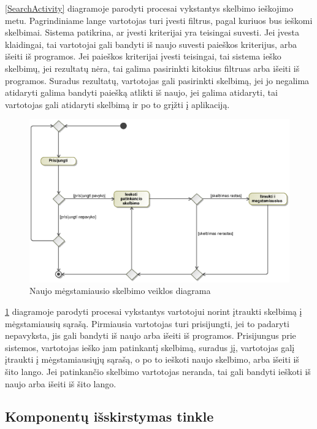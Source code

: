 \documentclass[12pt]{article}
\begin{document}
	\ref{SearchActivity} diagramoje parodyti procesai vykstantys skelbimo ieškojimo metu. Pagrindiniame lange vartotojas turi įvesti filtrus, pagal kuriuos bus ieškomi skelbimai. Sistema patikrina, ar įvesti kriterijai yra teisingai suvesti. Jei įvesta klaidingai, tai vartotojai gali bandyti iš naujo suvesti paieškos kriterijus, arba išeiti iš programos. Jei paieškos kriterijai įvesti teisingai, tai sistema ieško skelbimų, jei rezultatų nėra, tai galima pasirinkti kitokius filtruas arba išeiti iš programos. Suradus rezultatų, vartotojas gali pasirinkti skelbimą, jei jo negalima atidaryti galima bandyti paiešką atlikti iš naujo, jei galima atidaryti, tai vartotojas gali atidaryti skelbimą ir po to grįžti į aplikaciją.
	\pagebreak

	\begin{figure}[h]
		\begin{center}
			\includegraphics[width=\textwidth]{MegstamiausiuVeikla.eps}
			\caption{Naujo mėgstamiausio skelbimo veiklos diagrama\label{FavActivity}}
		\end{center}
	\end{figure}
	
	\ref{FavActivity} diagramoje parodyti procesai vykstantys vartotojui norint įtraukti skelbimą į mėgstamiausių sąrašą. Pirmiausia vartotojas turi prisijungti, jei to padaryti nepavyksta, jis gali bandyti iš naujo arba išeiti iš programos. Prisijungus prie sistemos, vartotojas ieško jam patinkantį skelbimą, suradus jį, vartotojas galį įtraukti į mėgstamiausiųjų sąrašą, o po to ieškoti naujo skelbimo, arba išeiti iš šito lango. Jei patinkančio skelbimo vartotojas neranda, tai gali bandyti ieškoti iš naujo arba išeiti iš šito lango.
	\pagebreak
	
	\subsection{Komponentų išskirstymas tinkle}
\end{document}
